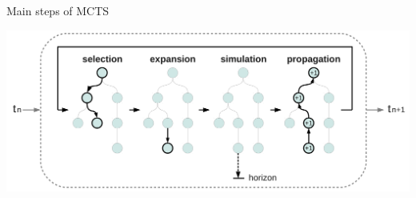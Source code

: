 \begin{frame}{Main steps of MCTS}
    \begin{center}
        \includegraphics[width=.99\linewidth]{figs/tree9}
    \end{center}
\end{frame}


